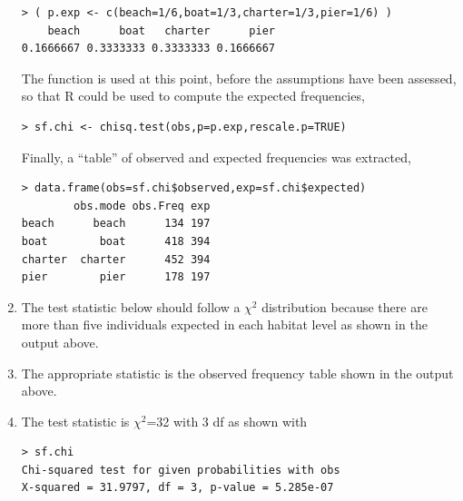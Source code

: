 \documentclass[10pt,openany]{book}\usepackage[]{graphicx}\usepackage[]{color}
\makeatletter
\newenvironment{kframe}{%
 \def\at@end@of@kframe{}%
 \ifinner\ifhmode%
  \def\at@end@of@kframe{\end{minipage}}%
  \begin{minipage}{\columnwidth}%
 \fi\fi%
 \def\FrameCommand##1{\hskip\@totalleftmargin \hskip-\fboxsep
 \colorbox{shadecolor}{##1}\hskip-\fboxsep
     \hskip-\linewidth \hskip-\@totalleftmargin \hskip\columnwidth}%
 \MakeFramed {\advance\hsize-\width
   \@totalleftmargin\z@ \linewidth\hsize
   \@setminipage}}%
 {\par\unskip\endMakeFramed%
 \at@end@of@kframe}
\newenvironment{knitrout}{}{} %
\makeatother
\begin{document}
\begin{enumerate}
\begin{knitrout}
\begin{kframe}
\begin{verbatim}
> ( p.exp <- c(beach=1/6,boat=1/3,charter=1/3,pier=1/6) )
    beach      boat   charter      pier 
0.1666667 0.3333333 0.3333333 0.1666667 
\end{verbatim}
\end{kframe}
\end{knitrout}
The  function is used at this point, before the assumptions have been assessed, so that R could be used to compute the expected frequencies,
\begin{knitrout}
\color{fgcolor}\begin{kframe}
\begin{verbatim}
> sf.chi <- chisq.test(obs,p=p.exp,rescale.p=TRUE)
\end{verbatim}
\end{kframe}
\end{knitrout}
Finally, a ``table'' of observed and expected frequencies was extracted,
\begin{knitrout}
\color{fgcolor}\begin{kframe}
\begin{verbatim}
> data.frame(obs=sf.chi$observed,exp=sf.chi$expected)
        obs.mode obs.Freq exp
beach      beach      134 197
boat        boat      418 394
charter  charter      452 394
pier        pier      178 197
\end{verbatim}
\end{kframe}
\end{knitrout}
  \item The test statistic below should follow a $\chi^{2}$ distribution because there are more than five individuals expected in each habitat level as shown in the output above.
  \item The appropriate statistic is the observed frequency table shown in the output above.
  \item The test statistic is $\chi^2$=32 with 3 df as shown with
\begin{knitrout}
\color{fgcolor}\begin{kframe}
\begin{verbatim}
> sf.chi
Chi-squared test for given probabilities with obs 
X-squared = 31.9797, df = 3, p-value = 5.285e-07
\end{verbatim}
\end{kframe}
\end{knitrout}

\end{enumerate}
\end{document}
